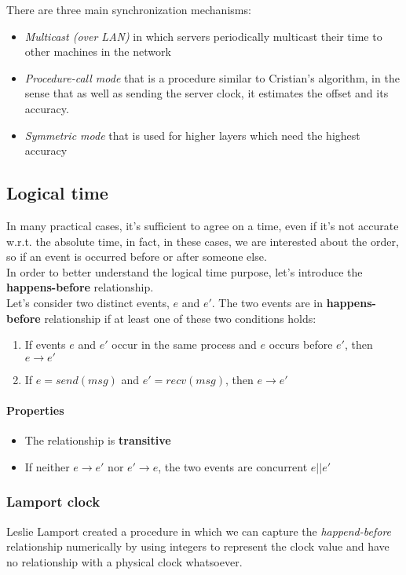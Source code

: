 There are three main synchronization mechanisms:
\begin{itemize}
    \item \textit{Multicast (over LAN)} in which servers periodically multicast their time to other machines in the network
    \item \textit{Procedure-call mode} that is a procedure similar to Cristian's algorithm, in the sense that as well as sending the server clock, it estimates the offset and its accuracy.
    \item \textit{Symmetric mode} that is used for higher layers which need the highest accuracy
\end{itemize}

\subsection{Logical time}
In many practical cases, it's sufficient to agree on a time, even if it's not accurate w.r.t. the absolute time, in fact, in these cases, we are interested about the order, so if an event is occurred before or after someone else.\\
In order to better understand the logical time purpose, let's introduce the \textbf{happens-before} relationship.\\
Let's consider two distinct events, $e$ and $e'$. The two events are in \textbf{happens-before} relationship if at least one of these two conditions holds:
\begin{enumerate}
    \item If events $e$ and $e'$ occur in the same process and $e$ occurs before $e'$, then $e \rightarrow e'$
    \item If $e = send(msg)$ and $e' = recv(msg)$, then $e \rightarrow e'$
\end{enumerate}

\paragraph{Properties}
\begin{itemize}
    \item The relationship is \textbf{transitive}
    \item If neither $e \rightarrow e'$ nor $e' \rightarrow e$, the two events are concurrent $e || e'$
\end{itemize}

\subsubsection{Lamport clock}
Leslie Lamport created a procedure in which we can capture the \textit{happend-before} relationship numerically by using integers to represent the clock value and have no relationship with a physical clock whatsoever.
